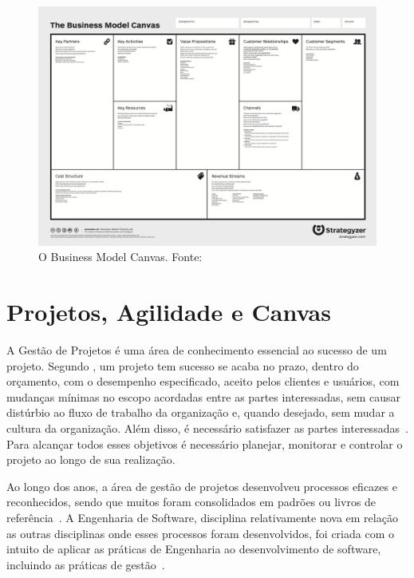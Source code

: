 \documentclass[a4]{report}
\newcommand{\othersize}{0.7\linewidth}
\begin{document}
\begin{figure}
    \centering
    \includegraphics[width=\othersize]{imagens/BMC.png}
    \caption{O Business Model Canvas. Fonte: \citet{osterwalder2010business}}
    \label{fig:bmc}
\end{figure}


\section{Projetos, Agilidade e Canvas}

A Gestão de Projetos é uma área de conhecimento essencial ao sucesso de um projeto. Segundo \citet{kerzner:12ed}, um projeto tem sucesso se
acaba no prazo, dentro do orçamento, com o desempenho especificado, aceito pelos clientes e usuários, com mudanças mínimas no escopo acordadas entre as partes interessadas, sem causar distúrbio ao fluxo de trabalho da organização e, quando desejado, sem mudar a cultura da organização. Além disso, é necessário satisfazer as partes interessadas~\citep{pmbok:6}. Para alcançar todos esses objetivos é necessário planejar, monitorar e controlar o projeto ao longo de sua realização.

Ao longo dos anos, a área de gestão de projetos desenvolveu processos eficazes e reconhecidos, sendo que muitos foram consolidados em padrões ou livros de referência~\citep{pmbok:6,kerzner:12ed}. A Engenharia de Software, disciplina relativamente nova em relação as outras disciplinas onde esses processos foram desenvolvidos, foi criada com o intuito de aplicar as práticas de Engenharia ao desenvolvimento de software, incluindo as práticas de gestão~\citep{naur:randell:1968,pressman:2019,ieee_computer_society_guide_2014}.
\end{document}
